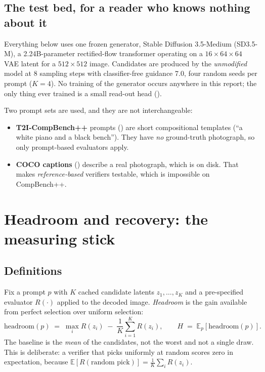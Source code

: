 \documentclass[10pt]{article}
\newcommand{\E}{\mathbb{E}}
\begin{document}
\subsection{The test bed, for a reader who knows nothing about it}

Everything below uses one frozen generator, Stable Diffusion 3.5-Medium (SD3.5-M), a
2.24B-parameter rectified-flow transformer operating on a $16\times64\times64$ VAE latent for a
$512\times512$ image. Candidates are produced by the \emph{unmodified} model at 8 sampling steps with
classifier-free guidance 7.0, four random seeds per prompt ($K=4$). No training of the generator
occurs anywhere in this report; the only thing ever trained is a small read-out head
().

Two prompt sets are used, and they are not interchangeable:
\begin{itemize}
  \item \textbf{T2I-CompBench++} prompts () are short compositional templates
    (``a white piano and a black bench''). They have \emph{no} ground-truth photograph, so only
    prompt-based evaluators apply.
  \item \textbf{COCO captions} () describe a real photograph, which is on disk.
    That makes \emph{reference-based} verifiers testable, which is impossible on CompBench++.
\end{itemize}

\section{Headroom and recovery: the measuring stick}
\label{sec:headroom}

\subsection{Definitions}

Fix a prompt $p$ with $K$ cached candidate latents $z_1,\dots,z_K$ and a pre-specified evaluator
$R(\cdot)$ applied to the decoded image. \emph{Headroom} is the gain available from perfect
selection over uniform selection:
\begin{equation}
  \mathrm{headroom}(p) \;=\; \max_i R(z_i) \;-\; \frac{1}{K}\sum_{i=1}^{K} R(z_i),
  \qquad
  H \;=\; \E_p\!\left[\mathrm{headroom}(p)\right].
\label{eq:headroom}
\end{equation}
The baseline is the \emph{mean} of the candidates, not the worst and not a single draw. This is
deliberate: a verifier that picks uniformly at random scores zero in expectation, because
$\E[R(\text{random pick})] = \frac1K\sum_i R(z_i)$.
\end{document}
